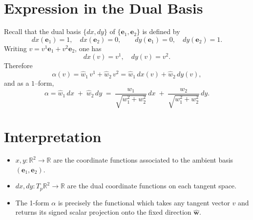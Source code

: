 \documentclass[12pt]{article}
\numberwithin{equation}{section}
\theoremstyle{definitionstyle}
\newcommand{\R}{\mathbb{R}}
\begin{document}
	\section{Expression in the Dual Basis}
	Recall that the dual basis \(\{dx,dy\}\) of \(\{\mathbf{e}_1,\mathbf{e}_2\}\) is defined by
	\[
	dx(\mathbf{e}_1)=1,\quad dx(\mathbf{e}_2)=0,
	\qquad
	dy(\mathbf{e}_1)=0,\quad dy(\mathbf{e}_2)=1.
	\]
	Writing \(v=v^1\mathbf{e}_1+v^2\mathbf{e}_2\), one has
	\[
	dx(v)=v^1,
	\quad
	dy(v)=v^2.
	\]
	Therefore
	\[
	\alpha(v)
	=\hat w_1\,v^1+\hat w_2\,v^2
	=\hat w_1\,dx(v)+\hat w_2\,dy(v),
	\]
	and as a \(1\)--form,
	\[
	\boxed{
		\alpha
		=\hat w_1\,dx \;+\;\hat w_2\,dy
		\;=\;
		\frac{w_1}{\sqrt{w_1^2+w_2^2}}\,dx
		\;+\;
		\frac{w_2}{\sqrt{w_1^2+w_2^2}}\,dy.
	}
	\]
	
	\section*{Interpretation}
	\begin{itemize}
		\item \(x,y\colon\R^2\to\R\) are the coordinate functions associated to the ambient basis \((\mathbf e_1,\mathbf e_2)\).
		\item \(dx,dy\colon T_p\R^2\to\R\) are the dual coordinate functions on each tangent space.
		\item The 1-form \(\alpha\) is precisely the functional which takes any tangent vector \(v\) and returns its signed scalar projection onto the fixed direction \(\hat{\mathbf w}\).
	\end{itemize}
	
\end{document}
